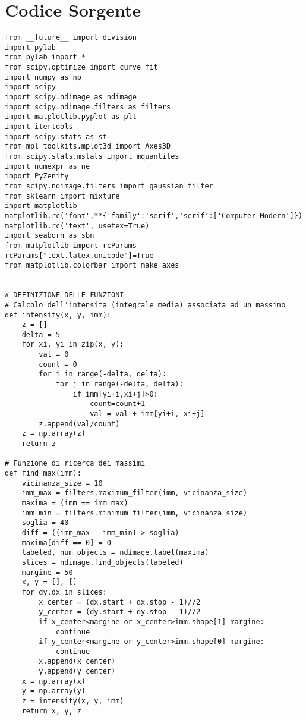 \clearpage{\pagestyle{empty}\cleardoublepage}
\chapter{Codice Sorgente} 
\label{appendiceWSS} 

\lstset{language=Python, numbers=left, stepnumber=1, breaklines=true}

\begin{lstlisting}
from __future__ import division
import pylab
from pylab import *
from scipy.optimize import curve_fit
import numpy as np
import scipy
import scipy.ndimage as ndimage
import scipy.ndimage.filters as filters
import matplotlib.pyplot as plt
import itertools
import scipy.stats as st
from mpl_toolkits.mplot3d import Axes3D
from scipy.stats.mstats import mquantiles
import numexpr as ne
import PyZenity
from scipy.ndimage.filters import gaussian_filter
from sklearn import mixture
import matplotlib
matplotlib.rc('font',**{'family':'serif','serif':['Computer Modern']})
matplotlib.rc('text', usetex=True)
import seaborn as sbn
from matplotlib import rcParams
rcParams["text.latex.unicode"]=True
from matplotlib.colorbar import make_axes


# DEFINIZIONE DELLE FUNZIONI ----------
# Calcolo dell'intensita (integrale media) associata ad un massimo 
def intensity(x, y, imm):
    z = []    
    delta = 5
    for xi, yi in zip(x, y):
        val = 0
        count = 0
        for i in range(-delta, delta):
            for j in range(-delta, delta):
                if imm[yi+i,xi+j]>0:
                    count=count+1
                    val = val + imm[yi+i, xi+j]
        z.append(val/count)  
    z = np.array(z)
    return z
        
# Funzione di ricerca dei massimi 
def find_max(imm):
    vicinanza_size = 10
    imm_max = filters.maximum_filter(imm, vicinanza_size)
    maxima = (imm == imm_max)
    imm_min = filters.minimum_filter(imm, vicinanza_size)
    soglia = 40
    diff = ((imm_max - imm_min) > soglia)
    maxima[diff == 0] = 0
    labeled, num_objects = ndimage.label(maxima)
    slices = ndimage.find_objects(labeled)
    margine = 50
    x, y = [], []
    for dy,dx in slices:
        x_center = (dx.start + dx.stop - 1)//2
        y_center = (dy.start + dy.stop - 1)//2 
        if x_center<margine or x_center>imm.shape[1]-margine:
            continue                                         
        if y_center<margine or y_center>imm.shape[0]-margine:
            continue
        x.append(x_center)
        y.append(y_center)
    x = np.array(x)
    y = np.array(y)
    z = intensity(x, y, imm)
    return x, y, z


\end{lstlisting}

